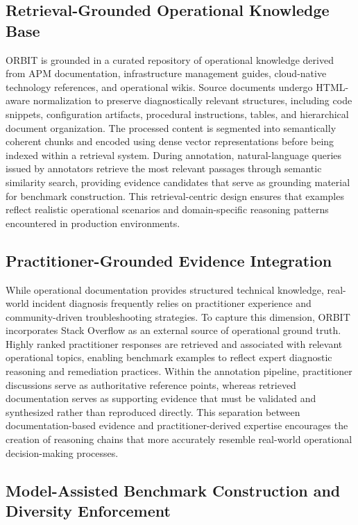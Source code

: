 \documentclass[conference]{IEEEtran}
\begin{document}
\subsection{Retrieval-Grounded Operational Knowledge Base}

ORBIT is grounded in a curated repository of operational knowledge derived from APM documentation, infrastructure management guides, cloud-native technology references, and operational wikis. Source documents undergo HTML-aware normalization to preserve diagnostically relevant structures, including code snippets, configuration artifacts, procedural instructions, tables, and hierarchical document organization. The processed content is segmented into semantically coherent chunks and encoded using dense vector representations before being indexed within a retrieval system. During annotation, natural-language queries issued by annotators retrieve the most relevant passages through semantic similarity search, providing evidence candidates that serve as grounding material for benchmark construction. This retrieval-centric design ensures that examples reflect realistic operational scenarios and domain-specific reasoning patterns encountered in production environments.

\subsection{Practitioner-Grounded Evidence Integration}

While operational documentation provides structured technical knowledge, real-world incident diagnosis frequently relies on practitioner experience and community-driven troubleshooting strategies. To capture this dimension, ORBIT incorporates Stack Overflow as an external source of operational ground truth. Highly ranked practitioner responses are retrieved and associated with relevant operational topics, enabling benchmark examples to reflect expert diagnostic reasoning and remediation practices. Within the annotation pipeline, practitioner discussions serve as authoritative reference points, whereas retrieved documentation serves as supporting evidence that must be validated and synthesized rather than reproduced directly. This separation between documentation-based evidence and practitioner-derived expertise encourages the creation of reasoning chains that more accurately resemble real-world operational decision-making processes.

\subsection{Model-Assisted Benchmark Construction and Diversity Enforcement}
\end{document}
